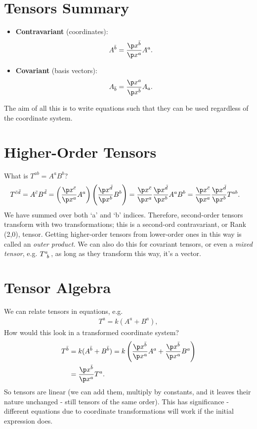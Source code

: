 \documentclass[a4paper, 11pt, normalem]{report}
\begin{document}
\section{Tensors Summary}
\begin{multicols}{2}
\begin{itemize}
    \item \textbf{Contravariant} (coordinates):
        \begin{align}
            A^{\bar{b}} &= \frac{\p x^{\bar{b}}}{\p x^a}A^a.
        \end{align}
    \item \textbf{Covariant} (basis vectors):
        \begin{align}
            A_{\bar{b}} &= \frac{\p x^a}{\p x^{\bar{b}}}A_a.
        \end{align}
\end{itemize}
\end{multicols}
The aim of all this is to write equations such that they can be used regardless of the coordinate system.

\section{Higher-Order Tensors}
What is $T^{ab}=A^aB^b$?
\begin{align}
    T^{\bar{c}\bar{d}} &= A^{\bar{c}}B^{\bar{d}} = \left(\frac{\p x^{\bar{c}}}{\p x^a}A^a\right)\left(\frac{\p x^{\bar{d}}}{\p x^b}B^b\right) = \frac{\p x^{\bar{c}}}{\p x^a}\frac{\p x^{\bar{d}}}{\p x^b}A^a B^b = \frac{\p x^{\bar{c}}}{\p x^a}\frac{\p x^{\bar{d}}}{\p x^b}T^{ab}.
\end{align}
We have summed over both `a' and `b' indices.
Therefore, second-order tensors transform with two transformations; this is a second-ord contravariant, or Rank (2,0), tensor. 
Getting higher-order tensors from lower-order ones in this way is called an \emph{outer product.}
We can also do this for covariant tensors, or even a \emph{mixed tensor}, e.g. $\tensor{T}{^a_b}$, as long as they transform this way, it's a vector. 

\section{Tensor Algebra}
We can relate tensors in equations, e.g.
\begin{align}
    T^a = k(A^a+B^a),
\end{align}
How would this look in a transformed coordinate system?
\begin{align}
    \begin{split}
        T^{\bar{b}} &= k(A^{\bar{b}}+B^{\bar{b}}) = k\left(\frac{\p x^{\bar{b}}}{\p x^a}A^a + \frac{\p x^{\bar{b}}}{\p x^a}B^a\right) \\
                    &= \frac{\p x^{\bar{b}}}{\p x^a}T^a.
    \end{split}
\end{align}
So tensors are linear (we can add them, multiply by constants, and it leaves their nature unchanged - still tensors of the same order).
This has significance - different equations due to coordinate transformations will work if the initial expression does. 
\end{document}
